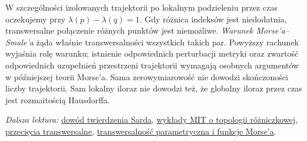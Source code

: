 W szczególności izolowanych trajektorii
po lokalnym podzieleniu przez czas oczekujemy przy
$\lambda(p)-\lambda(q)=1$. Gdy różnica
indeksów jest niedodatnia, transwersalne
połączenie różnych punktów jest niemożliwe.
\emph{Warunek Morse'a--Smale'a} żąda właśnie
transwersalności wszystkich takich par.
Powyższy rachunek wyjaśnia rolę warunku;
istnienie odpowiednich perturbacji metryki
oraz zwartość odpowiednich uzupełnień przestrzeni trajektorii
wymagają osobnych argumentów w późniejszej teorii Morse'a.
Sama zerowymiarowość nie dowodzi skończoności liczby
trajektorii. Sam lokalny iloraz nie dowodzi też, że
globalny iloraz przez czas jest rozmaitością Hausdorffa.

\par\smallskip
{\footnotesize\noindent\emph{Dalsza lektura:}
\href{https://www.math.ru.nl/~mueger/diff_notes.pdf}{dowód twierdzenia Sarda},
\href{https://ocw.mit.edu/courses/18-965-geometry-of-manifolds-fall-2004/pages/lecture-notes/}{wykłady MIT o topologii różniczkowej},
\href{https://people.maths.ox.ac.uk/ritter/morse-cambridge/lecture03.pdf}{przecięcia transwersalne},
\href{https://people.maths.ox.ac.uk/ritter/morse-cambridge/lecture04.pdf}{transwersalność parametryczna i funkcje Morse'a}.\par}
